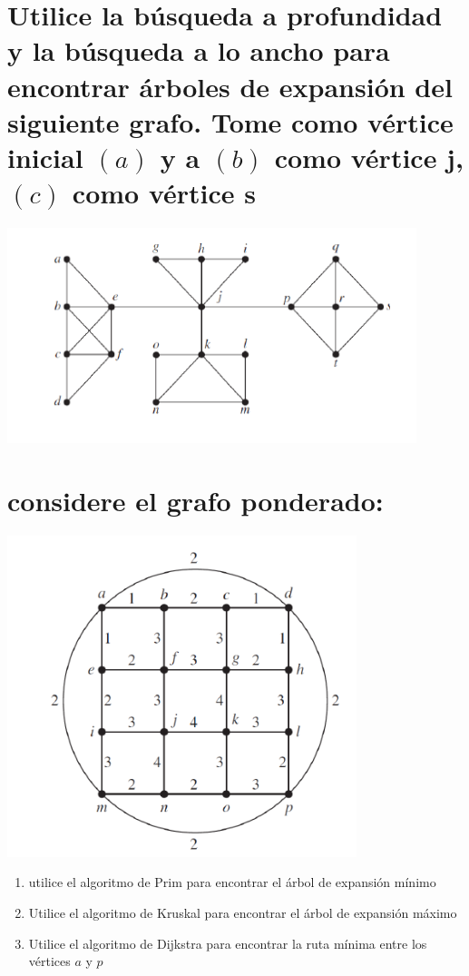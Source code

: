 \documentclass[10pt,a4paper]{article} %
\begin{document}
   \section{Utilice la búsqueda a profundidad y la búsqueda a lo ancho para
   encontrar árboles de expansión del siguiente grafo. Tome como vértice
   inicial $(a)$ y a $(b)$ como vértice  j, $(c)$ como vértice s}
       \begin{center}
       \includegraphics[width=0.5\linewidth]{grafop9.png}
       \end{center}




   \section{considere el grafo ponderado:}
        \begin{center}
            \includegraphics[width=0.4\linewidth]{grafop10}
        \end{center}
        \begin{enumerate}
            \item {utilice el algoritmo de Prim para encontrar el árbol de
                expansión mínimo}
            \item {Utilice el algoritmo de Kruskal para encontrar el árbol de expansión máximo}
            \item {Utilice el algoritmo de Dijkstra para encontrar la ruta
                mínima entre los vértices $a$ y $p$}
        \end{enumerate}
\end{document}
